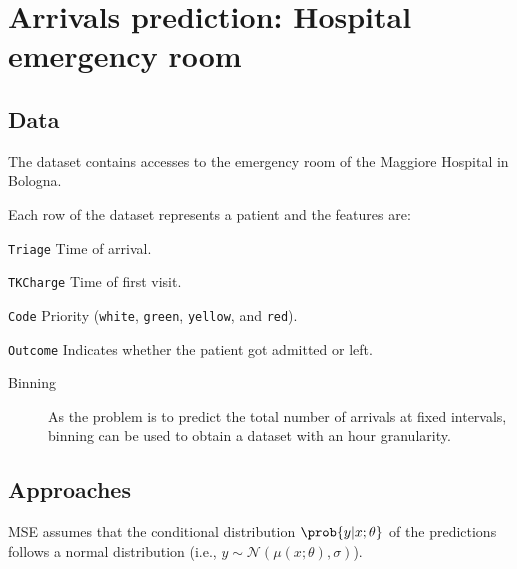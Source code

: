 \chapter{Arrivals prediction: Hospital emergency room} \label{ch:ap_hospital}


\section{Data}

The dataset contains accesses to the emergency room of the Maggiore Hospital in Bologna.

Each row of the dataset represents a patient and the features are:
\begin{descriptionlist}
    \item[\texttt{Triage}] Time of arrival.
    \item[\texttt{TKCharge}] Time of first visit.
    \item[\texttt{Code}] Priority (\texttt{white}, \texttt{green}, \texttt{yellow}, and \texttt{red}).
    \item[\texttt{Outcome}] Indicates whether the patient got admitted or left.
\end{descriptionlist}

\begin{description}
    \item[Binning] 
        As the problem is to predict the total number of arrivals at fixed intervals, binning can be used to obtain a dataset with an hour granularity.
\end{description}


\section{Approaches}

\begin{remark}
    MSE assumes that the conditional distribution $\prob{y | x; \theta}$ of the predictions follows a normal distribution (i.e., $y \sim \mathcal{N}(\mu(x; \theta), \sigma)$).
\end{remark}

